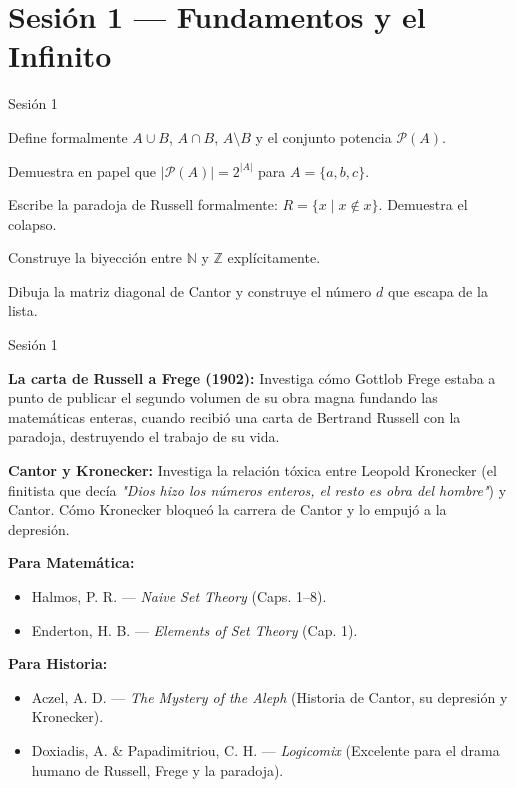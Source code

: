 \documentclass[11pt, letterpaper]{article}
\begin{document}
\section{Sesi\'on 1 --- Fundamentos y el Infinito}

\begin{verificacion}{Sesi\'on 1}
\begin{checklist}
  \item Define formalmente $A\cup B$, $A\cap B$, $A\setminus B$ y el conjunto potencia $\mathcal{P}(A)$.
  \item Demuestra en papel que $|\mathcal{P}(A)| = 2^{|A|}$ para $A=\{a,b,c\}$.
  \item Escribe la paradoja de Russell formalmente: $R=\{x \mid x\notin x\}$. Demuestra el colapso.
  \item Construye la biyecci\'on entre $\mathbb{N}$ y $\mathbb{Z}$ expl\'icitamente.
  \item Dibuja la matriz diagonal de Cantor y construye el n\'umero $d$ que escapa de la lista.
\end{checklist}
\end{verificacion}

\begin{historia}{Sesi\'on 1}
\begin{checklist}
  \item \textbf{La carta de Russell a Frege (1902):} Investiga c\'omo Gottlob Frege estaba a punto de publicar el segundo volumen de su obra magna fundando las matem\'aticas enteras, cuando recibi\'o una carta de Bertrand Russell con la paradoja, destruyendo el trabajo de su vida.
  \item \textbf{Cantor y Kronecker:} Investiga la relaci\'on t\'oxica entre Leopold Kronecker (el finitista que dec\'ia \textit{"Dios hizo los n\'umeros enteros, el resto es obra del hombre"}) y Cantor. C\'omo Kronecker bloque\'o la carrera de Cantor y lo empuj\'o a la depresi\'on.
\end{checklist}
\end{historia}

\begin{referencias}
\textbf{Para Matem\'atica:}
\begin{itemize}
    \item Halmos, P. R. --- \textit{Naive Set Theory} (Caps. 1--8).
    \item Enderton, H. B. --- \textit{Elements of Set Theory} (Cap. 1).
\end{itemize}
\textbf{Para Historia:}
\begin{itemize}
    \item Aczel, A. D. --- \textit{The Mystery of the Aleph} (Historia de Cantor, su depresi\'on y Kronecker).
    \item Doxiadis, A. \& Papadimitriou, C. H. --- \textit{Logicomix} (Excelente para el drama humano de Russell, Frege y la paradoja).
\end{itemize}
\end{referencias}
\end{document}
